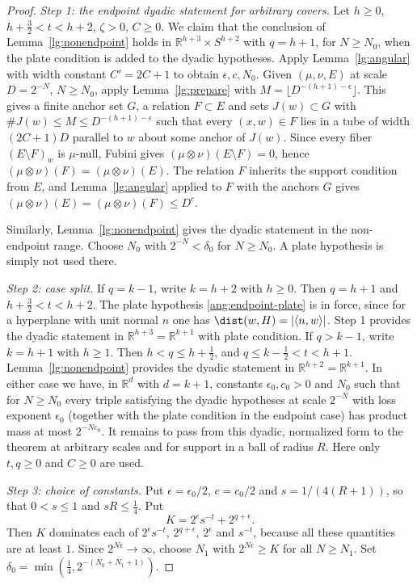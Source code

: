 \begin{proof}
\emph{Step 1: the endpoint dyadic statement for arbitrary covers.} Let $h\ge0$, $h+\frac32<t<h+2$, $\zeta>0$, $C\ge0$. We claim that the conclusion of Lemma~\ref{lg:nonendpoint} holds in $\mathbb R^{h+3}\times S^{h+2}$ with $q=h+1$, for $N\ge N_0$, when the plate condition is added to the dyadic hypotheses. Apply Lemma~\ref{lg:angular} with width constant $C'=2C+1$ to obtain $\epsilon,c,N_0$. Given $(\mu,\nu,E)$ at scale $D=2^{-N}$, $N\ge N_0$, apply Lemma~\ref{lg:prepare} with $M=\lfloor D^{-(h+1)-\epsilon}\rfloor$. This gives a finite anchor set $G$, a relation $F\subset E$ and sets $J(w)\subset G$ with $\#J(w)\le M\le D^{-(h+1)-\epsilon}$ such that every $(x,w)\in F$ lies in a tube of width $(2C+1)D$ parallel to $w$ about some anchor of $J(w)$. Since every fiber $(E\setminus F)_w$ is $\mu$-null, Fubini gives $(\mu\otimes\nu)(E\setminus F)=0$, hence $(\mu\otimes\nu)(F)=(\mu\otimes\nu)(E)$. The relation $F$ inherits the support condition from $E$, and Lemma~\ref{lg:angular} applied to $F$ with the anchors $G$ gives $(\mu\otimes\nu)(E)=(\mu\otimes\nu)(F)\le D^c$.

Similarly, Lemma~\ref{lg:nonendpoint} gives the dyadic statement in the non-endpoint range. Choose $N_0$ with $2^{-N}<\delta_0$ for $N\ge N_0$. A plate hypothesis is simply not used there.

\emph{Step 2: case split.} If $q=k-1$, write $k=h+2$ with $h\ge0$. Then $q=h+1$ and $h+\frac32<t<h+2$. The plate hypothesis \eqref{ang:endpoint-plate} is in force, since for a hyperplane with unit normal $n$ one has $\dist(w,H)=|\langle n,w\rangle|$. Step 1 provides the dyadic statement in $\mathbb R^{h+3}=\mathbb R^{k+1}$ with plate condition. If $q>k-1$, write $k=h+1$ with $h\ge1$. Then $h<q\le h+\frac12$, and $q\le k-\frac12<t<h+1$. Lemma~\ref{lg:nonendpoint} provides the dyadic statement in $\mathbb R^{h+2}=\mathbb R^{k+1}$. In either case we have, in $\mathbb R^{d}$ with $d=k+1$, constants $\epsilon_0,c_0>0$ and $N_0$ such that for $N\ge N_0$ every triple satisfying the dyadic hypotheses at scale $2^{-N}$ with loss exponent $\epsilon_0$ (together with the plate condition in the endpoint case) has product mass at most $2^{-Nc_0}$. It remains to pass from this dyadic, normalized form to the theorem at arbitrary scales and for support in a ball of radius $R$. Here only $t,q\ge0$ and $C\ge0$ are used.

\emph{Step 3: choice of constants.} Put $\epsilon=\epsilon_0/2$, $c=c_0/2$ and $s=1/(4(R+1))$, so that $0<s\le1$ and $sR\le\frac14$. Put
\[
 K=2^{\epsilon}s^{-t}+2^{q+\epsilon}.
\]
Then $K$ dominates each of $2^\epsilon s^{-t}$, $2^{q+\epsilon}$, $2^\epsilon$ and $s^{-t}$, because all these quantities are at least $1$. Since $2^{N\epsilon}\to\infty$, choose $N_1$ with $2^{N\epsilon}\ge K$ for all $N\ge N_1$. Set $\delta_0=\min(\frac14,2^{-(N_0+N_1+1)})$.


\end{proof}
